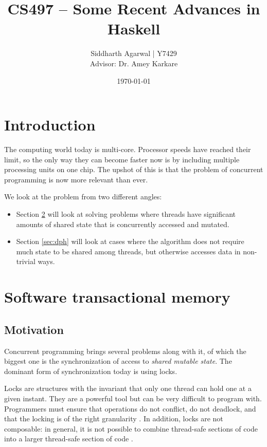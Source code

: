 \documentclass[a4paper]{acmtrans2m}
\title{CS497 -- Some Recent Advances in Haskell}
\author{Siddharth Agarwal | Y7429\\
  Advisor: Dr. Amey Karkare}
\date{\today}
\begin{document}
\maketitle

\section{Introduction}
The computing world today is multi-core. Processor speeds have reached their
limit, so the only way they can become faster now is by including multiple
processing units on one chip. The upshot of this is that the problem of
concurrent programming is now more relevant than ever.

We look at the problem from two different angles:
\begin{itemize}
\item Section \ref{sec:stm} will look at solving problems where threads have
  significant amounts of shared state that is concurrently accessed and mutated.
\item Section \ref{sec:dph} will look at cases where the algorithm does not
  require much state to be shared among threads, but otherwise accesses data in
  non-trivial ways.
\end{itemize}

\section{Software transactional memory}
\label{sec:stm}

\subsection{Motivation}

Concurrent programming brings several problems along with it, of which the
biggest one is the synchronization of access to \textit{shared mutable
  state}. The dominant form of synchronization today is using locks.

Locks are structures with the invariant that only one thread can hold one at
a given instant. They are a powerful tool but can be very difficult to program
with. Programmers must ensure that operations do not conflict, do not deadlock,
and that the locking is of the right granularity \cite{Duffy:2010}. In addition,
locks are not composable: in general, it is not possible to combine thread-safe
sections of code into a larger thread-safe section of code \cite{Harris:2005}.
\end{document}
